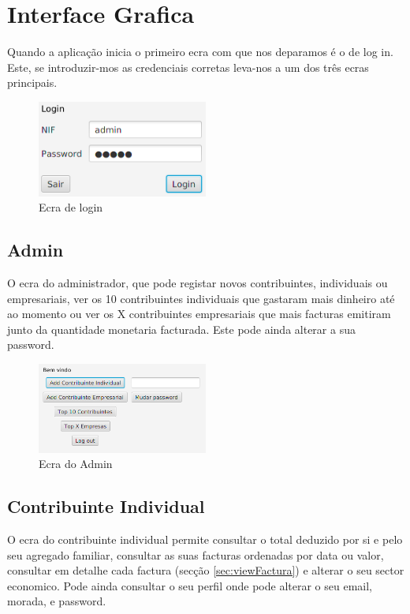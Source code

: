 \documentclass[12pt,a4paper]{report}
\begin{document}
\chapter{Interface Grafica}

    Quando a aplicação inicia o primeiro ecra com que nos deparamos é o de log
    in. Este, se introduzir-mos as credenciais corretas leva-nos a um dos três
    ecras principais.
\begin{figure}[h]
    \centering
    \includegraphics[width=0.5\textwidth]{./images/login.png}
    \caption{Ecra de login}
    \label{fig:login}
\end{figure}

    \section{Admin} %
    O ecra do administrador, que pode registar novos contribuintes, individuais
    ou empresariais, ver os 10 contribuintes individuais que gastaram mais
    dinheiro até ao momento ou ver os X contribuintes empresariais que mais
    facturas emitiram junto da quantidade monetaria facturada.
    Este pode ainda alterar a sua password.
\begin{figure}[h]
    \centering
    \includegraphics[width=0.5\textwidth]{./images/AdminScreen.png}
    \caption{Ecra do Admin}
    \label{fig:admin}
\end{figure}

\pagebreak

    \section{Contribuinte Individual}
    O ecra do contribuinte individual permite consultar o total deduzido por
    si e pelo seu agregado familiar, consultar as suas facturas ordenadas por
    data ou valor, consultar em detalhe cada factura
    (secção \ref{sec:viewFactura}) e alterar o seu sector economico. Pode ainda
    consultar o seu perfil onde pode alterar o seu email, morada, e password.
\end{document}
